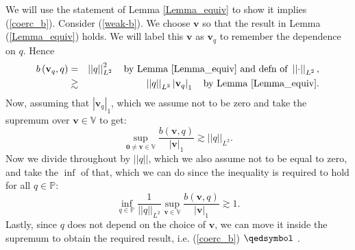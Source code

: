 \documentclass[12pt,a4paper]{article}
\theoremstyle{definition}
\begin{document}
We will use the statement of Lemma \ref{Lemma_equiv} to show it implies (\ref{coerc_b}).  Consider (\ref{weak-b}).  We choose $\textbf{v}$ so that the result in Lemma (\ref{Lemma_equiv}) holds. We will label this $\textbf{v}$ as $\textbf{v}_q$ to remember the dependence on $q$.   Hence
\begin{eqnarray}
b\left(\textbf{v}_q,q\right) &=& \left|\left|q\right|\right|_{L^2}^2 \quad\text{by Lemma \ref{Lemma_equiv}  and defn of } \nonumber \left|\left|\cdot\right|\right|_{L^2},\\
&\gtrsim& \left|\left|q\right|\right|_{L^2} \left|\textbf{v}_q\right|_1\quad \text{by Lemma \ref{Lemma_equiv}}.\nonumber
\end{eqnarray}
Now, assuming that $\left|\textbf{v}_q\right|_1$, which we assume not to be zero and take the supremum over $\textbf{v}\in \mathbb{V}$ to get:
\begin{equation}
\sup_{\textbf{0}\neq\textbf{v}\in \mathbb{V}}\frac{b\left(\textbf{v},q\right)}{\left|\textbf{v}\right|_1} \gtrsim \left|\left|q\right|\right|_{L^2}.\nonumber
\end{equation}
Now we divide throughout by $\left|\left|q\right|\right|$, which we also assume not to be equal to zero, and take the $\inf$ of that, which we can do since the inequality is required to hold for all $q\in \mathbb{P}$:
\begin{equation}
\inf_{q\in \mathbb{P}}\frac{1}{\left|\left|q\right|\right|_{L^2}}\sup_{\textbf{v}\in \mathbb{V}}\frac{b\left(\textbf{v},q\right)}{\left|\textbf{v}\right|_1} \gtrsim 1 \nonumber.
\end{equation}
Lastly, since $q$ does not depend on the choice of $\textbf{v}$, we can move it inside the supremum to obtain the required result, i.e. (\ref{coerc_b}) $\qedsymbol$ .  
\end{document}
